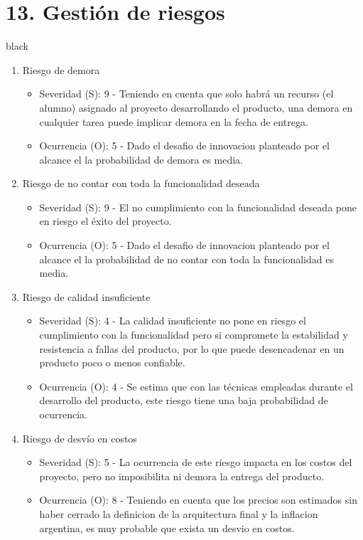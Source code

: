 \documentclass[
11pt, %
]{charter}
\begin{document}
\section{13. Gestión de riesgos}
\label{sec:riesgos}
\begin{consigna}{black}

\begin{enumerate}

\item Riesgo de demora
\begin{itemize}
	\item Severidad (S): 9 - Teniendo en cuenta que solo habrá un recurso (el alumno) asignado al proyecto desarrollando el producto, una demora en cualquier tarea puede implicar demora en la fecha de entrega.
	\item Ocurrencia (O): 5 - Dado el desafio de innovacion planteado por el alcance el la probabilidad de demora es media.
\end{itemize}


\item Riesgo de no contar con toda la funcionalidad deseada
\begin{itemize}
	\item Severidad (S): 9 - El no cumplimiento con la funcionalidad deseada pone en riesgo el éxito del proyecto.
	\item Ocurrencia (O): 5 - Dado el desafio de innovacion planteado por el alcance el la probabilidad de no contar con toda la funcionalidad es media.
\end{itemize}

\item Riesgo de calidad insuficiente
\begin{itemize}
	\item Severidad (S): 4 - La calidad insuficiente no pone en riesgo el cumplimiento con la funcionalidad pero si compromete la estabilidad y resistencia a fallas del producto, por lo que puede desencadenar en un producto poco o menos confiable.
	\item Ocurrencia (O): 4 - Se estima que con las técnicas empleadas durante el desarrollo del producto, este riesgo tiene una baja probabilidad de ocurrencia.
\end{itemize}


\item Riesgo de desvío en costos
\begin{itemize}
	\item Severidad (S): 5 - La ocurrencia de este riesgo impacta en los costos del proyecto, pero no imposibilita ni demora la entrega del producto.
	\item Ocurrencia (O): 8 - Teniendo en cuenta que los precios son estimados sin haber cerrado la definicion de la arquitectura final y la inflacion argentina, es muy probable que exista un desvio en costos.
\end{itemize}


\end{enumerate}
\end{consigna}
\end{document}
